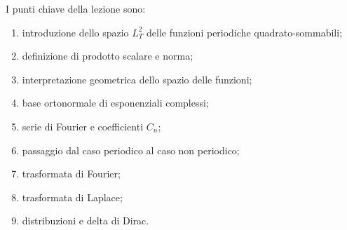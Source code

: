 I punti chiave della lezione sono:
\begin{enumerate}
    \item introduzione dello spazio \(L_T^2\) delle funzioni periodiche quadrato-sommabili;
    \item definizione di prodotto scalare e norma;
    \item interpretazione geometrica dello spazio delle funzioni;
    \item base ortonormale di esponenziali complessi;
    \item serie di Fourier e coefficienti \(C_n\);
    \item passaggio dal caso periodico al caso non periodico;
    \item trasformata di Fourier;
    \item trasformata di Laplace;
    \item distribuzioni e delta di Dirac.
\end{enumerate}